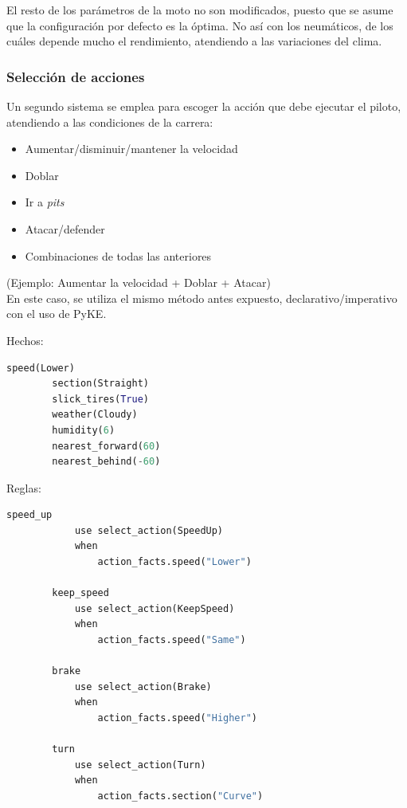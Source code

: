 \documentclass[12pt, letterpaper,spanish]{article}
\theoremstyle{definition}
\theoremstyle{remark}
\begin{document}
		El resto de los parámetros de la moto no son modificados, puesto que se asume que la configuración por defecto es la óptima. No así con los neumáticos, de los cuáles depende mucho el rendimiento, atendiendo a las variaciones del clima.
	
		\subsubsection{Selección de acciones}
		Un segundo sistema se emplea para escoger la acción que debe ejecutar el piloto, atendiendo a las condiciones de la carrera:
		\begin{itemize}
			\item Aumentar/disminuir/mantener la velocidad
			\item Doblar
			\item Ir a \emph{pits}
			\item Atacar/defender
			\item Combinaciones de todas las anteriores
		\end{itemize}		

		(Ejemplo: Aumentar la velocidad + Doblar + Atacar) \\
	
		En este caso, se utiliza el mismo método antes expuesto, declarativo/imperativo con el uso de PyKE.

		Hechos:
		\begin{lstlisting}[language={Python}, label={Script}]
		speed(Lower)
		section(Straight)
		slick_tires(True)
		weather(Cloudy)
		humidity(6)
		nearest_forward(60)
		nearest_behind(-60)
		\end{lstlisting}

		Reglas:
		\begin{lstlisting}[language={Python}, label={Script}]
		speed_up
 		    use select_action(SpeedUp)
  		    when
		        action_facts.speed("Lower")

		keep_speed
		    use select_action(KeepSpeed)
		    when
		        action_facts.speed("Same")

		brake
		    use select_action(Brake)
		    when
		        action_facts.speed("Higher")

		turn
		    use select_action(Turn)
		    when
		        action_facts.section("Curve")
		\end{lstlisting}
	
\end{document}
